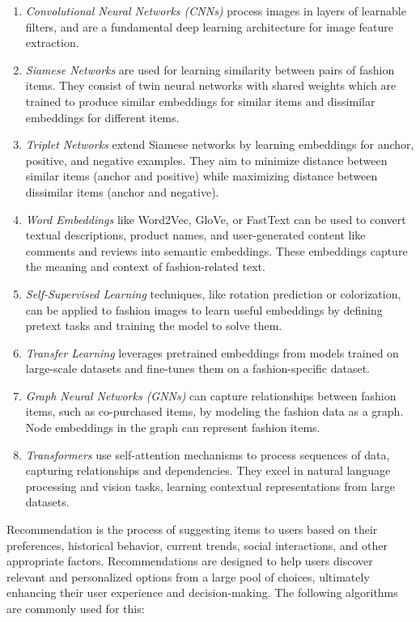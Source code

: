 		\begin{enumerate}
			\item \textit{Convolutional Neural Networks (CNNs)} process images in layers of learnable filters, and are a fundamental deep learning architecture for image feature extraction.
			\item \textit{Siamese Networks} are used for learning similarity between pairs of fashion items. They consist of twin neural networks with shared weights which are trained to produce similar embeddings for similar items and dissimilar embeddings for different items.
			\item \textit{Triplet Networks} extend Siamese networks by learning embeddings for anchor, positive, and negative examples. They aim to minimize distance between similar items (anchor and positive) while maximizing distance between dissimilar items (anchor and negative).
			\item \textit{Word Embeddings} like Word2Vec, GloVe, or FastText can be used to convert textual descriptions, product names, and user-generated content like comments and reviews into semantic embeddings. These embeddings capture the meaning and context of fashion-related text.
			\item \textit{Self-Supervised Learning} techniques, like rotation prediction or colorization, can be applied to fashion images to learn useful embeddings by defining pretext tasks and training the model to solve them.
			\item \textit{Transfer Learning} leverages pretrained embeddings from models trained on large-scale datasets and fine-tunes them on a fashion-specific dataset.
			\item \textit{Graph Neural Networks (GNNs)} can capture relationships between fashion items, such as co-purchased items, by modeling the fashion data as a graph. Node embeddings in the graph can represent fashion items.
			\item \textit{Transformers} use self-attention mechanisms to process sequences of data, capturing relationships and dependencies. They excel in natural language processing and vision tasks, learning contextual representations from large datasets.
		\end{enumerate}

		Recommendation is the process of suggesting items to users based on their preferences, historical behavior, current trends, social interactions, and other appropriate factors. Recommendations are designed to help users discover relevant and personalized options from a large pool of choices, ultimately enhancing their user experience and decision-making. The following algorithms are commonly used for this:

